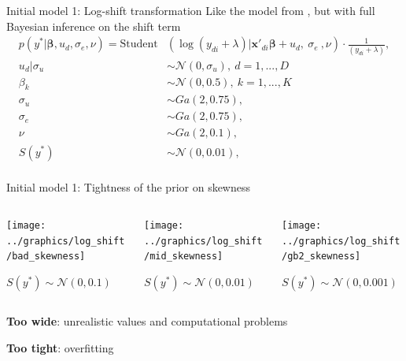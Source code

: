 \begin{frame}{Initial model 1: Log-shift transformation}
    Like the model from \cite{morelli_hierarchical_2021}, but with full Bayesian inference on the shift term
    \begin{equation}
        \begin{split}
            p(y^*|\boldsymbol \beta, u_d, \sigma_e, \nu)   =        \text{Student}&(\log(y_{di} + \lambda)| \boldsymbol{x'}_{di} \boldsymbol \beta + u_d,\ \sigma_e\ , \nu)\cdot \frac 1 {(y_{di} + \lambda)}, \\
            u_d | \sigma_u & \sim \mathcal N(0, \sigma_u),\ d = 1, ..., D \\
            \beta_k & \sim \mathcal N(0, 0.5),\ k = 1, ..., K\\
            \sigma_u & \sim Ga(2, 0.75), \\
            \sigma_e & \sim Ga(2, 0.75), \\
            \nu & \sim Ga(2, 0.1), \\
            S(y^*) & \sim \mathcal N(0, 0.01),\\
        \end{split}
        \label{eq:trafo_hb}
    \end{equation}
\end{frame}

\begin{frame}{Initial model 1: Tightness of the prior on skewness}

    \begin{columns}
        \begin{column}{0.32\textwidth}
            \texttt{[image: ../graphics/log\_shift/bad\_skewness]}

            $S(y^*) \sim \mathcal N (0, 0.1)$
        \end{column}



        \begin{column}{0.32\textwidth}
            \texttt{[image: ../graphics/log\_shift/mid\_skewness]}

            $S(y^*) \sim \mathcal N (0, 0.01)$
        \end{column}


        \begin{column}{0.32\textwidth}
            \texttt{[image: ../graphics/log\_shift/gb2\_skewness]}

            $S(y^*) \sim \mathcal N (0, 0.001)$
        \end{column}

    \end{columns}
    \vspace{1cm}
    \textbf{Too wide}: unrealistic values and computational problems
    \vspace{0.5cm}

    \textbf{Too tight}: overfitting
\end{frame}

